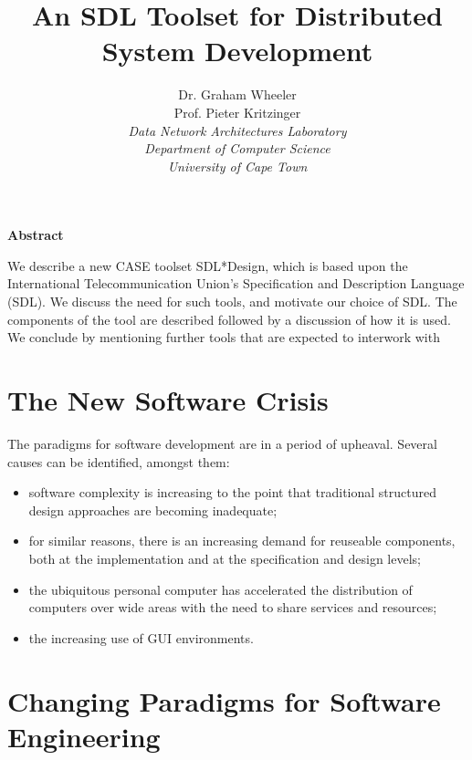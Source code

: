
\title{An SDL Toolset for Distributed System Development}
\author{Dr. Graham Wheeler\\Prof. Pieter Kritzinger\\
{\em Data Network Architectures Laboratory}\\
{\em Department of Computer Science}\\
{\em University of Cape Town}}
\maketitle

\begin{center}
{\bf Abstract}
\end{center}

We describe a new CASE toolset SDL*Design, 
which is based upon the International Telecommunication
Union's Specification and Description Language (SDL). We discuss the
need for such tools, and motivate our choice of SDL. The components
of the tool are described followed by a discussion of how it is used.
We conclude by mentioning further tools that are expected to
interwork with 

\section{The New Software Crisis}

The paradigms for software development are in a period of upheaval.
Several causes can be identified, amongst them:

\begin{itemize}
\item software complexity
is increasing to the point that traditional structured design approaches 
are becoming inadequate;
\item for similar reasons, there is an increasing demand for
reuseable components, both at the implementation and at the
specification and design levels;
\item the ubiquitous personal computer has accelerated the distribution
of computers over wide areas with the need to share services
and resources;
\item the increasing use of GUI environments. 
\end{itemize}

\section{Changing Paradigms for Software Engineering}

